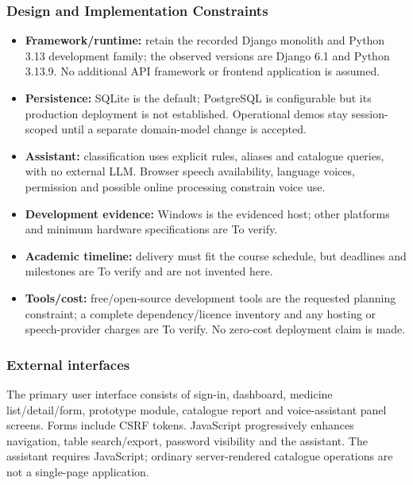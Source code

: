 \documentclass{article}
\begin{document}
\subsubsection{Design and Implementation Constraints}
\begin{itemize}
\item \textbf{Framework/runtime:} retain the recorded Django monolith and Python 3.13 development family; the observed versions are Django 6.1 and Python 3.13.9. No additional API framework or frontend application is assumed.
\item \textbf{Persistence:} SQLite is the default; PostgreSQL is configurable but its production deployment is not established. Operational demos stay session-scoped until a separate domain-model change is accepted.
\item \textbf{Assistant:} classification uses explicit rules, aliases and catalogue queries, with no external LLM. Browser speech availability, language voices, permission and possible online processing constrain voice use.
\item \textbf{Development evidence:} Windows is the evidenced host; other platforms and minimum hardware specifications are To verify.
\item \textbf{Academic timeline:} delivery must fit the course schedule, but deadlines and milestones are To verify and are not invented here.
\item \textbf{Tools/cost:} free/open-source development tools are the requested planning constraint; a complete dependency/licence inventory and any hosting or speech-provider charges are To verify. No zero-cost deployment claim is made.
\end{itemize}

\subsubsection{External interfaces}
The primary user interface consists of sign-in, dashboard, medicine list/detail/form, prototype module, catalogue report and voice-assistant panel screens. Forms include CSRF tokens. JavaScript progressively enhances navigation, table search/export, password visibility and the assistant. The assistant requires JavaScript; ordinary server-rendered catalogue operations are not a single-page application.
\end{document}
